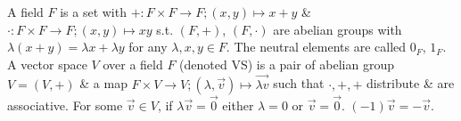  A field $F$ is a set with $+ : F \times F \to F; (x, y) \mapsto x + y$ \& $\cdot : F \times F \to F; (x, y) \mapsto xy$ s.t. $(F,+)$, $(F,\cdot)$ are abelian groups with $\lambda(x + y) = \lambda x + \lambda y$  for any $\lambda, x, y \in F$. The neutral elements are called $0_{F}$, $1_{F}$.
 A vector space $V$ over a field $F$ (denoted VS) is a pair of abelian group $V=(V, +)$ \& a map $F \times V \to V; (\lambda, \vec{v}) \mapsto \vec{\lambda v}$ such that $\cdot,+,+$ distribute \& are associative.
 For some $\vec{v} \in V$, if $\lambda\vec{v} = \vec{0}$ either $\lambda=0$ or $\vec{v}=\vec{0}$.
 $(-1)\vec{v} = -\vec{v}$.
